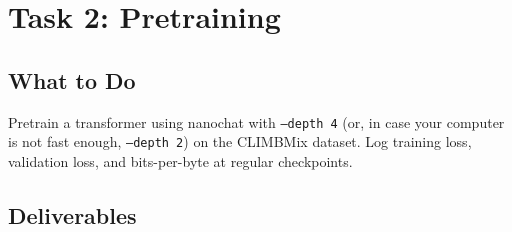 


\section{Task 2: Pretraining}
\label{sec:task2}

\subsection{What to Do}

Pretrain a transformer using nanochat with \texttt{--depth~4} (or, in case your computer is not fast enough, \texttt{--depth~2}) on the CLIMBMix dataset. Log training loss, validation loss, and bits-per-byte at regular checkpoints.

\subsection{Deliverables}

